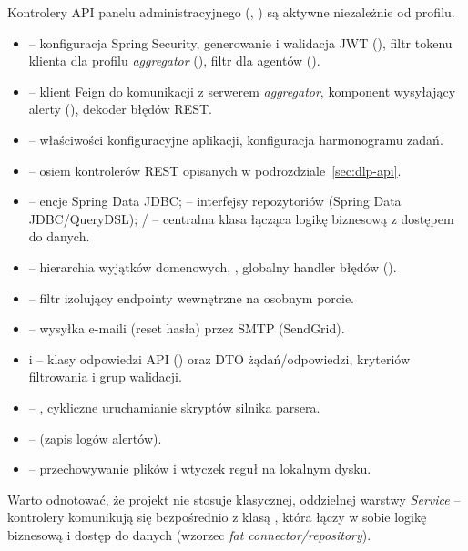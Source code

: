 Kontrolery API panelu administracyjnego (, ) są aktywne niezależnie od profilu.


\begin{itemize}[leftmargin=1.6em]
  \item {} -- konfiguracja Spring Security, generowanie i walidacja JWT
        (), filtr tokenu klienta dla profilu \emph{aggregator}
        (), filtr  dla agentów ().
  \item {} -- klient Feign do komunikacji z serwerem \emph{aggregator}, komponent
        wysyłający alerty (), dekoder błędów REST.
  \item {} -- właściwości konfiguracyjne aplikacji, konfiguracja harmonogramu zadań.
  \item {} -- osiem kontrolerów REST opisanych w podrozdziale~\ref{sec:dlp-api}.
  \item {} -- encje Spring Data JDBC;  -- interfejsy repozytoriów
        (Spring Data JDBC/QueryDSL); / -- centralna
        klasa łącząca logikę biznesową z dostępem do danych.
  \item {} -- hierarchia wyjątków domenowych, , globalny handler
        błędów ().
  \item {} -- filtr izolujący endpointy wewnętrzne na osobnym porcie.
  \item {} -- wysyłka e-maili (reset hasła) przez SMTP (SendGrid).
  \item {} i  -- klasy odpowiedzi API () oraz DTO
        żądań/odpowiedzi, kryteriów filtrowania i grup walidacji.
  \item {} -- , cykliczne uruchamianie skryptów silnika parsera.
  \item {} --  (zapis logów alertów).
  \item {} -- przechowywanie plików i wtyczek reguł na lokalnym dysku.
\end{itemize}

Warto odnotować, że projekt nie stosuje klasycznej, oddzielnej warstwy \emph{Service} -- kontrolery
komunikują się bezpośrednio z klasą , która łączy w sobie logikę biznesową
i dostęp do danych (wzorzec \emph{fat connector/repository}).

